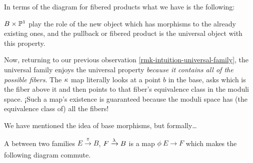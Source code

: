 \documentclass[12pt]{memoir}
\begin{document}
\begin{ptcb}
In terms of the diagram for fibered products what we have is the following:
\begin{center}
\end{center}
$B\times\mathbb{P}^1$ play the role of the new object which has morphisms to the already existing ones, and the pullback or fibered product is the universal object with this property.
\end{ptcb}

\begin{Rmk}
    Now, returning to our previous observation \ref{rmk-intuition-universal-family}, the universal family enjoys the universal property \emph{because it contains all of the possible fibers}. The $\kappa$ map literally looks at a point $b$ in the base, asks which is the fiber above it and then points to that fiber's equivalence class in the moduli space. ¡Such a map's existence is guaranteed because the moduli space has (the equivalence class of) all the fibers!
\end{Rmk}

We have mentioned the idea of base morphisms, but formally\dots

\begin{Def}
    A  between two families $E\xrightarrow[]{\pi}B$, $F\xrightarrow[]{\lambda}B$ is a map $\phi\:E\to F$ which makes the following diagram commute.
    \begin{center}
    \end{center}
\end{Def}
\end{document}
